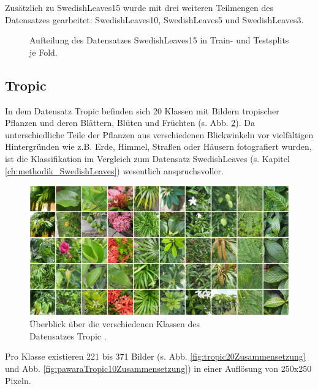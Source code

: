 Zusätzlich zu SwedishLeaves15 wurde mit drei weiteren Teilmengen des Datensatzes gearbeitet: SwedishLeaves10, SwedishLeaves5 und SwedishLeaves3.

\begin{figure}[H]
\begin{adjustbox}{width=1.4\textwidth, center}

\end{adjustbox}
\caption{Aufteilung des Datensatzes SwedishLeaves15 \cite{swedishLeaves} in Train- und Testsplits je Fold.}
\label{fig:swedishLeavesZusammensetzung}
\end{figure}
\newpage
\subsection{Tropic}
\label{ch:methodik_Tropic}
In dem Datensatz Tropic \cite{pawaraWebsiteDatensaetze} befinden sich 20 Klassen mit Bildern tropischer Pflanzen und deren Blättern, Blüten und Früchten (s. Abb. \ref{fig:tropicUeberblick}). Da unterschiedliche Teile der Pflanzen aus verschiedenen Blickwinkeln vor vielfältigen Hintergründen wie z.B. Erde, Himmel, Straßen oder Häusern fotografiert wurden, ist die Klassifikation im Vergleich zum Datensatz SwedishLeaves \cite{swedishLeaves} (s. Kapitel \ref{ch:methodik_SwedishLeaves}) wesentlich anspruchsvoller.


\begin{figure}[H]
\centering
\includegraphics[scale=0.14]{img/2_tropic10-image.jpg}
\caption{Überblick über die verschiedenen Klassen des\\
Datensatzes Tropic \cite{pawaraTropic}.}
\label{fig:tropicUeberblick}
\end{figure}

Pro Klasse existieren 221 bis 371 Bilder (s. Abb. \ref{fig:tropic20Zusammensetzung} und Abb. \ref{fig:pawaraTropic10Zusammensetzung}) in einer Auflösung von 250x250 Pixeln.

